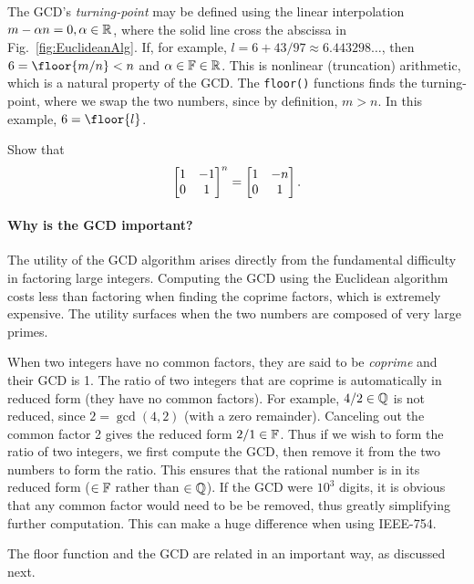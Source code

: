 \documentclass{ximera}
\begin{document}
\begin{tcolorbox}
The GCD's \emph{turning-point} may be defined using the linear interpolation $m-\alpha n=0, \alpha\in\mathbb{R}$,
where the solid line cross the abscissa in Fig.~\ref{fig:EuclideanAlg}.  If, for example, $l= 6+43/97
\approx 6.443298 \dots$, then $6=\floor{m/n}<n$ and $\alpha\in\mathbb{F}\in\mathbb{R}$. This is nonlinear (truncation)
arithmetic, which is a natural property of the GCD.  The \texttt{floor()} functions finds the
turning-point, where we swap the two numbers, since by definition, $m>n$.  In this example,
$6=\floor{l}$.
\end{tcolorbox}

\BEx
Show that
\[
\begin{bmatrix}
1 & -1\\
0 & 1
\end{bmatrix} ^n
=
\begin{bmatrix}
1 & -n\\
0 & 1
\end{bmatrix}.
\]
\EEx

\paragraph{Why is the GCD important?}
The utility of the GCD algorithm arises directly from the fundamental difficulty in factoring large integers.
Computing the GCD using the Euclidean algorithm costs less than factoring when finding the
coprime factors, which is extremely expensive.  The utility surfaces when the two numbers are composed
of very large primes.

When two integers have no common factors, they are said to be \emph{coprime} and their GCD is 1.
The ratio of two integers that are coprime is automatically in reduced form (they have
no common factors).  For example, $4/2 \in \mathbb{Q}$ is not reduced, since $2=\gcd(4,2)$ (with a zero remainder).
Canceling out the common factor 2 gives the reduced form $2/1\in\mathbb{F}$. Thus if we wish to form the ratio of
two integers, we first compute the GCD, then remove it from the two numbers to form the ratio. This
ensures that the rational number is in its reduced form ($\in\mathbb{F}$ rather than $\in\mathbb{Q}$).  If the GCD were
$10^3$ digits, it is obvious that any common factor would need to be be removed, thus greatly simplifying
further computation.  This can make a huge difference when using IEEE-754.

The floor function and the GCD are related in an important way, as discussed next.
\end{document}
